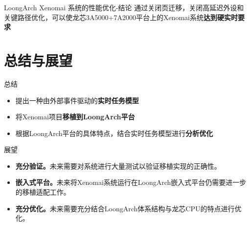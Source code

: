 \documentclass{beamer}
\begin{document}
\begin{frame}{LoongArch Xenomai 系统的性能优化-结论}
    通过关闭页迁移，关闭高延迟外设和关键路径优化，可以使龙芯3A5000+7A2000平台上的Xenomai系统\textbf{达到硬实时要求}
\end{frame}
\section{总结与展望}

\begin{frame}{总结}
    \begin{itemize}
        \item 提出一种由外部事件驱动的\textbf{实时任务模型}
        \item 将Xenomai项目\textbf{移植到LoongArch平台}
        \item 根据LoongArch平台的具体特点，结合实时任务模型进行\textbf{分析优化}
    \end{itemize}
\end{frame}

\begin{frame}{展望}
    \begin{itemize}
        \item \textbf{充分验证。}未来需要对系统进行大量测试以验证移植实现的正确性。
        \item \textbf{嵌入式平台。}未来将Xenomai系统运行在LoongArch嵌入式平台仍需要进一步的移植适配工作。
        \item \textbf{充分优化。}未来需要充分结合LoongArch体系结构与龙芯CPU的特点进行优化。
    \end{itemize}
\end{frame}



\end{document}
